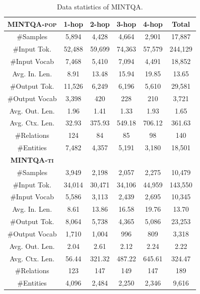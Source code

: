 
\begin{table}[!t]
\tiny
    \centering
    \begin{tabular}{c|cccc|c}
\hline
\textbf{\textsc{MINTQA-pop}} & \textbf{1-hop} & \textbf{2-hop} & \textbf{3-hop} & \textbf{4-hop} & \textbf{Total} \\
\hline
\#Samples & 5,894 & 4,428 & 4,664 & 2,901 & 17,887 \\
\hline
\#Input Tok. & 52,488 & 59,699 & 74,363 & 57,579 & 244,129 \\
\#Input Vocab & 7,468 & 5,410 & 7,094 & 4,491 & 18,852 \\
Avg. In. Len. & 8.91 & 13.48 & 15.94 & 19.85 & 13.65 \\
\#Output Tok. & 11,526 & 6,249 & 6,196 & 5,610 & 29,581 \\
\#Output Vocab & 3,398 & 420 & 228 & 210 & 3,721 \\
Avg. Out. Len. & 1.96 & 1.41 & 1.33 & 1.93 & 1.65 \\
Avg. Ctx. Len. & 32.93 & 375.93 & 549.18 & 706.12 & 361.63 \\
\#Relations & 124 & 84 & 85 & 98 & 140 \\
\#Entities & 7,482 & 4,357 & 5,191 & 3,180 & 18,501 \\
\hline
\textbf{\textsc{MINTQA-ti}} &  &  &  &  &  \\
\hline
\#Samples & 3,949 & 2,198 & 2,057 & 2,275 & 10,479 \\
\#Input Tok. & 34,014 & 30,471 & 34,106 & 44,959 & 143,550 \\
\#Input Vocab & 5,586 & 3,113 & 2,439 & 2,695 & 10,345 \\
Avg. In. Len. & 8.61 & 13.86 & 16.58 & 19.76 & 13.70 \\
\#Output Tok. & 8,064 & 5,738 & 4,365 & 5,086 & 23,253 \\
\#Output Vocab & 1,710 & 1,004 & 996 & 809 & 3,318 \\
Avg. Out. Len. & 2.04 & 2.61 & 2.12 & 2.24 & 2.22 \\
Avg. Ctx. Len. & 56.44 & 321.32 & 487.22 & 645.61 & 324.47 \\
\#Relations & 123 & 147 & 149 & 147 & 189 \\
\#Entities & 4,096 & 2,484 & 2,250 & 2,346 & 9,616 \\
\hline
    \end{tabular}
    \caption{Data statistics of MINTQA.}
    \label{tab:data_statis_table}
    \vspace{-0.3cm}
\end{table}
